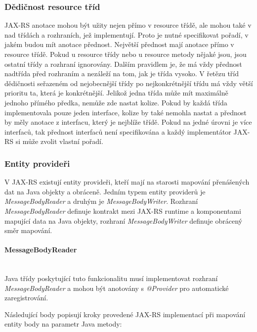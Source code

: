 \documentclass[11pt,twoside,a4paper]{book}
\begin{document}
\subsubsection{Dědičnost resource tříd}
\label{subsec:dedicnost-resource-trid}

JAX-RS anotace mohou být užity nejen přímo v resource třídě, ale mohou také v
nad třídách a rozhraních, jež implementují. Proto je nutné specifikovat pořadí,
v jakém budou mít anotace přednost. Největší přednost mají anotace přímo v
resource třídě. Pokud u resource třídy nebo u resource metody nějaké jsou, jsou
ostatní třídy a rozhraní ignorovány. Dalším pravidlem je, že má vždy přednost
nadtřída před rozhraním a nezáleží na tom, jak je třída vysoko. V řetězu tříd
dědičnosti seřazeném od nejobecnější třídy po nejkonkrétnější třídu má vždy
větší prioritu ta, která je konkrétnější. Jelikož jedna třída může mít maximálně
jednoho přímého předka, nemůže zde nastat kolize. Pokud by každá třída
implementovala pouze jeden interface, kolize by také nemohla nastat a přednost
by měly anotace z interfacu, který je nejblíže třídě. Pokud na jedné úrovni je
více interfaců, tak přednost interfaců není specifikována a každý implementátor
JAX-RS si může zvolit vlastní pořadí.

\subsubsection{Entity provideři}
\label{subsec:entity-provideri}

V JAX-RS existují entity provideři, kteří mají na starosti mapování přenášených
dat na Java objekty a obráceně. Jedním typem entity providerů je {\em
MessageBodyReader} a druhým je {\em MessageBodyWriter}.  Rozhraní 
{\em MessageBodyReader} definuje kontrakt mezi JAX-RS runtime a komponentami
mapující data na Java objekty, rozhraní {\em MessageBodyWriter} definuje
obrácený směr mapování.

\paragraph{MessageBodyReader}
\label{par:messagebodyreader}
\mbox{}\\

Java třídy poskytující tuto funkcionalitu musí implementovat rozhraní
{\em MessageBodyReader} a mohou být anotovány s {\em @Provider} pro automatické
zaregistrování.

Následující body popisují kroky provedené JAX-RS implementací při mapování
entity body na parametr Java metody:
\end{document}
